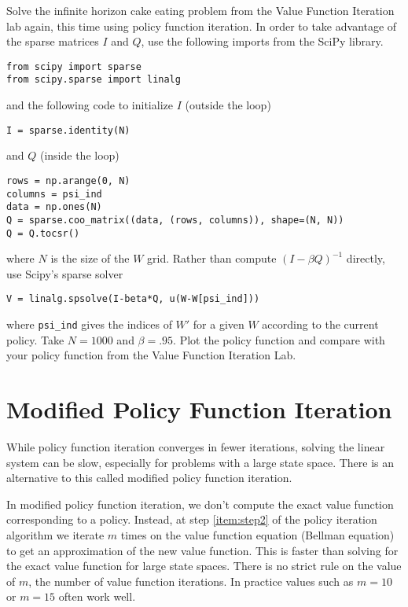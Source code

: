 \begin{problem}
\label{prob:cake_eating_policyfun}
Solve the infinite horizon cake eating problem from the Value Function Iteration lab again, this time using policy function iteration.  In order to take advantage of the sparse matrices $I$ and $Q$, use the following imports from the SciPy  library.
\begin{lstlisting}
from scipy import sparse
from scipy.sparse import linalg
\end{lstlisting}
and the following code to initialize $I$ (outside the loop)
\begin{lstlisting}
I = sparse.identity(N)
\end{lstlisting}
and $Q$ (inside the loop)
\begin{lstlisting}
rows = np.arange(0, N)
columns = psi_ind
data = np.ones(N)
Q = sparse.coo_matrix((data, (rows, columns)), shape=(N, N))
Q = Q.tocsr()
\end{lstlisting}
where $N$ is the size of the $W$ grid.  Rather than compute $(I-\beta Q)^{-1}$ directly, use Scipy's sparse solver
\begin{lstlisting}
V = linalg.spsolve(I-beta*Q, u(W-W[psi_ind]))
\end{lstlisting}
where \texttt{psi\_ind} gives the indices of $W'$ for a given $W$ according to the current policy.  
Take $N = 1000$ and $\beta = .95$.
Plot the policy function and compare with your policy function from the Value Function Iteration Lab.
\end{problem}

\section*{Modified Policy Function Iteration}
While policy function iteration converges in fewer iterations, solving the linear system can be slow, especially for problems with a large state space.  There is an alternative to this called modified policy function iteration.

In modified policy function iteration, we don't compute the exact value function corresponding to a policy.  Instead, at step \ref{item:step2} of the policy iteration algorithm we iterate $m$ times on the value function equation (Bellman equation) to get an approximation of the new value function.  This is faster than solving for the exact value function for large state spaces.  There is no strict rule on the value of $m$, the number of value function iterations.  In practice values such as $m=10$ or $m=15$ often work well.


